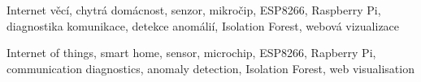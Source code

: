 
\begin{keywords_cs}
\vspace{1cm}

Internet věcí, chytrá domácnost, senzor, mikročip, ESP8266, Raspberry Pi, diagnostika komunikace, detekce anomálií, Isolation Forest, webová vizualizace

\vspace{1cm}
\end{keywords_cs}

\begin{keywords_en}
\vspace{1cm}

Internet of things, smart home, sensor, microchip, ESP8266, Rapberry Pi, communication diagnostics, anomaly detection, Isolation Forest, web visualisation

\end{keywords_en}